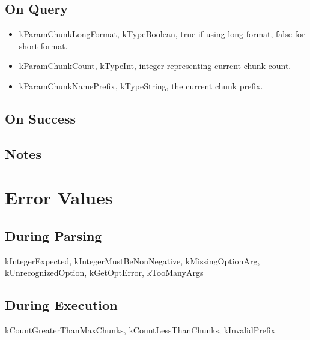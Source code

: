 \documentclass[10pt]{article}
\begin{document}
\subsection*{ On Query }
\begin{itemize}
\item  kParamChunkLongFormat, kTypeBoolean, true if using long format, false for short format. 
\item  kParamChunkCount, kTypeInt, integer representing current chunk count. 
\item  kParamChunkNamePrefix, kTypeString, the current chunk prefix. 

\end{itemize}
\subsection*{ On Success }
\subsection*{ Notes }
\section*{ Error Values }
\subsection*{ During Parsing }


 kIntegerExpected, kIntegerMustBeNonNegative, kMissingOptionArg, kUnrecognizedOption, kGetOptError, kTooManyArgs
\subsection*{ During Execution }


 kCountGreaterThanMaxChunks, kCountLessThanChunks, kInvalidPrefix
\end{document}
